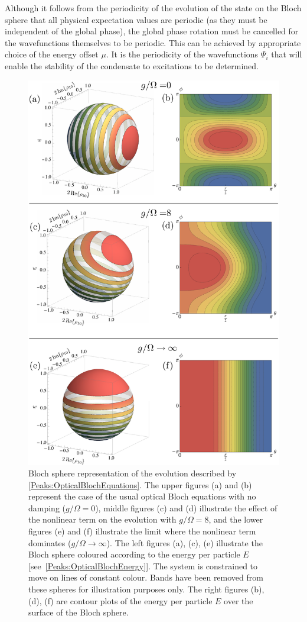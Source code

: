 Although it follows from the periodicity of the evolution of the state on the Bloch sphere that all physical expectation values are periodic (as they must be independent of the global phase), the global phase rotation must be cancelled for the wavefunctions themselves to be periodic. This can be achieved by appropriate choice of the energy offset $\mu$. It is the periodicity of the wavefunctions $\Psi_i$ that will enable the stability of the condensate to excitations to be determined.

\begin{figure}
    \centering
    \includegraphics[width=13cm]{BlochSpheres}
    \caption{Bloch sphere representation of the evolution described by \eqref{Peaks:OpticalBlochEquations}. The upper figures (a) and (b) represent the case of the usual optical Bloch equations with no damping ($g/\Omega=0$), middle figures (c) and (d) illustrate the effect of the nonlinear term on the evolution with $g/\Omega = 8$, and the lower figures (e) and (f) illustrate the limit where the nonlinear term dominates ($g/\Omega \rightarrow \infty$). The left figures (a), (c), (e) illustrate the Bloch sphere coloured according to the energy per particle $E$ [see~\eqref{Peaks:OpticalBlochEnergy}]. The system is constrained to move on lines of constant colour. Bands have been removed from these spheres for illustration purposes only. The right figures (b), (d), (f) are contour plots of the energy per particle $E$ over the surface of the Bloch sphere.
}
\end{figure}
